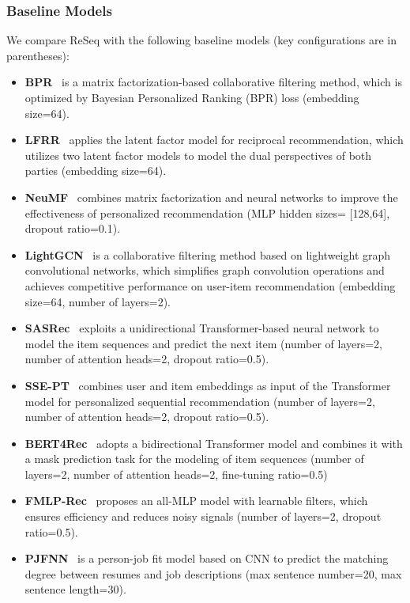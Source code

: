 \subsubsection{Baseline Models}
We compare ReSeq with the following baseline models (key configurations are in parentheses):
\begin{itemize}
\item {\textbf{BPR}~\cite{rendle2009bpr}} is a matrix factorization-based collaborative filtering method, which is optimized by Bayesian Personalized Ranking (BPR) loss (embedding size=64).
\item {\textbf{LFRR}~\cite{neve2019latent}} applies the latent factor model for reciprocal recommendation, which utilizes two latent factor models to model the dual perspectives of both parties (embedding size=64).
\item {\textbf{NeuMF}~\cite{he2017neural}} combines matrix factorization and neural networks to improve the effectiveness of personalized recommendation (MLP hidden sizes= [128,64], dropout ratio=0.1).
\item {\textbf{LightGCN}~\cite{he2020lightgcn}} is a collaborative filtering method based on lightweight graph convolutional networks, which simplifies graph convolution operations and achieves competitive performance on user-item recommendation (embedding size=64, number of layers=2).
\item {\textbf{SASRec}~\cite{kang2018self}} exploits a unidirectional Transformer-based neural network to model the item sequences and predict the next item (number of layers=2, number of attention heads=2, dropout ratio=0.5).
\item {\textbf{SSE-PT}~\cite{wu2020sse}} combines user and item embeddings as input of the Transformer model for personalized sequential recommendation (number of layers=2, number of attention heads=2, dropout ratio=0.5).
\item {\textbf{BERT4Rec}~\cite{sun2019bert4rec}} adopts a bidirectional Transformer model and combines it with a mask prediction task for the modeling of item sequences (number of layers=2, number of attention heads=2, fine-tuning ratio=0.5)
\item {\textbf{FMLP-Rec}~\cite{zhou2022filter}} proposes an all-MLP model with learnable filters, which ensures efficiency and reduces noisy signals (number of layers=2, dropout ratio=0.5).
\item {\textbf{PJFNN}~\cite{zhu2018person}} is a person-job fit model based on CNN to predict the matching degree between resumes and job descriptions (max sentence number=20, max sentence length=30).

\end{itemize}
